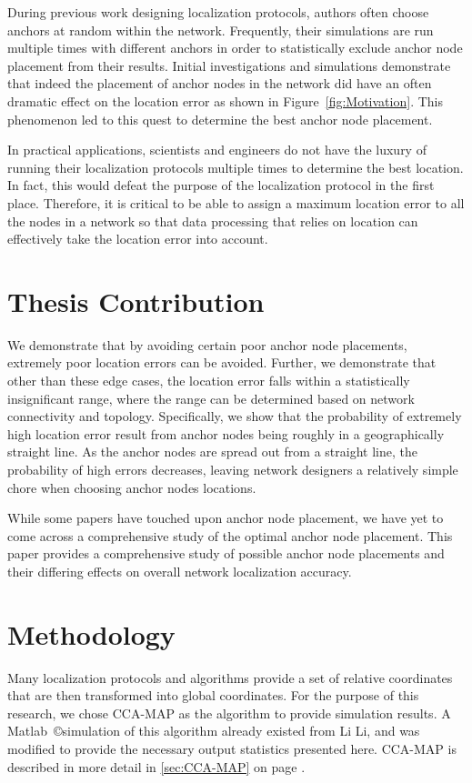 During previous work designing localization protocols\cite[p. 11]{CCA-MAP09}\cite[p.2 ]{MDS-MAP}, authors often choose anchors at random within the network.  Frequently, their simulations are run multiple times with different anchors in order to statistically exclude anchor node placement from their results. Initial investigations and simulations demonstrate that indeed the placement of anchor nodes in the network did have an often dramatic effect on the location error as shown in Figure~\ref{fig:Motivation}.  This phenomenon led to this quest to determine the best anchor node placement.

In practical applications, scientists and engineers do not have the luxury of running their localization protocols multiple times to determine the best location.  In fact, this would defeat the purpose of the localization protocol in the first place.  Therefore, it is critical to be able to assign a maximum location error to all the nodes in a network so that data processing that relies on location can effectively take the location error into account.  

\section{Thesis Contribution}
We demonstrate that by avoiding certain poor anchor node placements, extremely poor location errors can be avoided.  Further, we demonstrate that other than these edge cases, the location error falls within a statistically insignificant range, where the range can be determined based on network connectivity and topology.  Specifically, we show that the probability of extremely high location error result from anchor nodes being roughly in a geographically straight line.  As the anchor nodes are spread out from a straight line, the probability of high errors decreases, leaving network designers a relatively simple chore when choosing anchor nodes locations.

While some papers have touched upon anchor node placement, we have yet to come across a comprehensive study of the optimal anchor node placement.  This paper provides a comprehensive study of possible anchor node placements and their differing effects on overall network localization accuracy.

\section{Methodology}
Many localization protocols and algorithms provide a set of relative coordinates that are then transformed into global coordinates.  For the purpose of this research, we chose CCA-MAP\cite{CCA-MAP07,CCA-MAP09} as the algorithm to provide simulation results.  A Matlab~\copyright simulation of this algorithm already existed from Li Li\cite{CCA-MAP07}, and was modified to provide the necessary output statistics presented here.  CCA-MAP is described in more detail in \ref{sec:CCA-MAP} on page \pageref{sec:CCA-MAP}.


